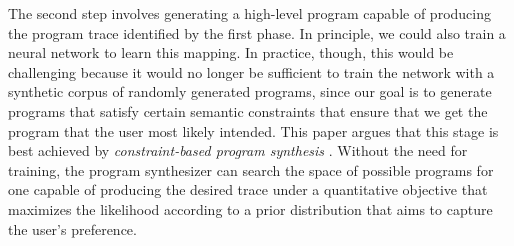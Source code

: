 \documentclass{article}
\begin{document}
The second step involves generating a high-level program capable of producing the program trace identified by the first phase. In principle, we could also train a neural network to learn this mapping. In practice, though, this would be challenging because it would no longer be sufficient to train the network with a synthetic corpus of randomly generated programs, since our goal is to generate programs that satisfy certain semantic constraints that ensure that we get the program that the user most likely intended. This paper argues that this stage is best achieved by \emph{constraint-based program synthesis} \cite{}. Without the need for training, the program synthesizer can search the space of possible programs for one capable of producing the desired trace under a quantitative objective that maximizes the likelihood according to a prior distribution that aims to capture the user’s preference.


\end{document}
